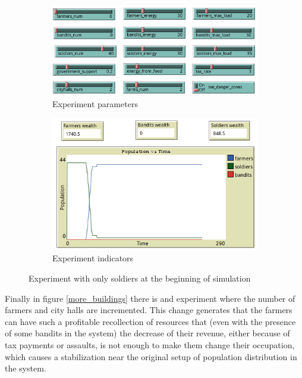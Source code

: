 \documentclass{wscpaperproc}
\begin{document}
\begin{figure}[h!]
    \begin{subfigure}{0.45\textwidth}
    \includegraphics[width=\textwidth]{Images/Exp4_sliders.png}
    \caption{Experiment parameters}
    \end{subfigure}
    \hfill
    \begin{subfigure}{0.45\textwidth}
    \includegraphics[width=\textwidth]{Images/Exp4_indicators.png}
    \caption{Experiment indicators}
    \end{subfigure}%
    \caption{Experiment with only soldiers at the beginning of simulation}
    \label{soldiers_only}
\end{figure}

\newpage

Finally in figure \ref{more_buildings} there is and experiment where the number
of farmers and city halls are incremented. This change generates that the farmers
can have such a profitable recollection of resources that (even with the presence
of some bandits in the system) the decrease of their revenue, either because of
tax payments or assaults, is not enough to make them change their occupation,
which causes a stabilization near the original setup of population distribution
in the system.
\end{document}
